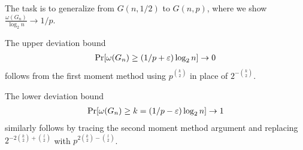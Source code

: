 \documentclass[12pt,letterpaper,boxed]{hmcpset}
\begin{document}
\begin{problem}
\end{problem}

\begin{solution}
  The task is to generalize from $G(n,1/2)$ to $G(n,p)$, where we show
  $\frac{\omega(G_n)}{\log_2 n} \to 1/p$.

  The upper deviation bound
  \begin{align}
    \Pr[\omega(G_n) \geq (1/p + \varepsilon) \log_2 n] \to 0
  \end{align}
  follows from the first moment method using $p^{\binom{k}{2}}$ in place of
  $2^{-\binom{k}{2}}$.

  The lower deviation bound
  \begin{align}
    \Pr[\omega(G_n) \geq k = (1/p - \varepsilon) \log_2 n] \to 1
  \end{align}
  similarly follows by tracing the second moment method argument and replacing
  $2^{-2 \binom{k}{2} + \binom{l}{2}}$
  with $p^{2 \binom{k}{2} - \binom{l}{2}}$.
\end{solution}

\begin{problem}
\end{problem}
\end{document}
